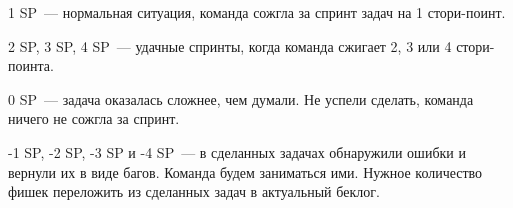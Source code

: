 \documentclass{article}
\begin{document}
1 SP~--- нормальная ситуация, команда сожгла за спринт задач на 1 стори-поинт.

2 SP, 3 SP, 4 SP~--- удачные спринты, когда команда сжигает 2, 3 или 4 стори-поинта.

0 SP~--- задача оказалась сложнее, чем думали. Не успели сделать, команда ничего не сожгла за спринт.

-1 SP, -2 SP, -3 SP и -4 SP~--- в сделанных задачах обнаружили ошибки и вернули их в виде багов. Команда будем заниматься ими. Нужное количество фишек переложить из сделанных задач в актуальный беклог.
\end{document}
